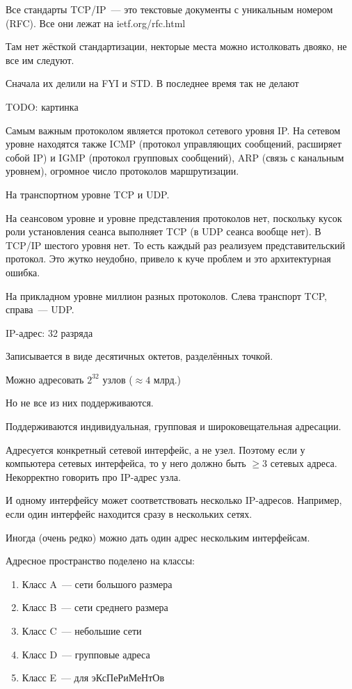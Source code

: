 
Все стандарты TCP/IP~--- это текстовые документы с уникальным номером (RFC). Все они лежат на ietf.org/rfc.html

Там нет жёсткой стандартизации, некторые места можно истолковать двояко, не все им следуют.

Сначала их делили на FYI и STD. В последнее время так не делают


TODO: картинка

Самым важным протоколом является протокол сетевого уровня IP. На сетевом уровне находятся также ICMP (протокол управляющих сообщений, расширяет собой IP) и IGMP (протокол групповых сообщений), ARP (связь с канальным уровнем), огромное число протоколов маршрутизации.

На транспортном уровне TCP и UDP. 

На сеансовом уровне и уровне представления протоколов нет, поскольку кусок роли установления сеанса выполняет TCP (в UDP сеанса вообще нет). В TCP/IP шестого уровня нет. То есть каждый раз реализуем представительский протокол. Это жутко неудобно, привело к куче проблем и это архитектурная ошибка.

На прикладном уровне миллион разных протоколов. Слева транспорт TCP, справа~--- UDP. 


IP-адрес: 32 разряда

Записывается в виде десятичных октетов, разделённых точкой.

Можно адресовать $2^{32}$ узлов ($\approx 4\text{ млрд.}$)

Но не все из них поддерживаются.

Поддерживаются индивидуальная, групповая и широковещательная адресации.

Адресуется конкретный сетевой интерфейс, а не узел. Поэтому если у компьютера  сетевых интерфейса, то у него должно быть $\ge 3$ сетевых адреса. Некорректно говорить про IP-адрес узла.

И одному интерфейсу может соответствовать несколько IP-адресов. Например, если один интерфейс находится сразу в нескольких сетях.

Иногда (очень редко) можно дать один адрес нескольким интерфейсам.

Адресное пространство поделено на классы:

\begin{enumerate}
    \item Класс A~--- сети большого размера
    \item Класс B~--- сети среднего размера
    \item Класс C~--- небольшие сети
    \item Класс D~--- групповые адреса
    \item Класс E~--- для эКсПеРиМеНтОв
\end{enumerate}


